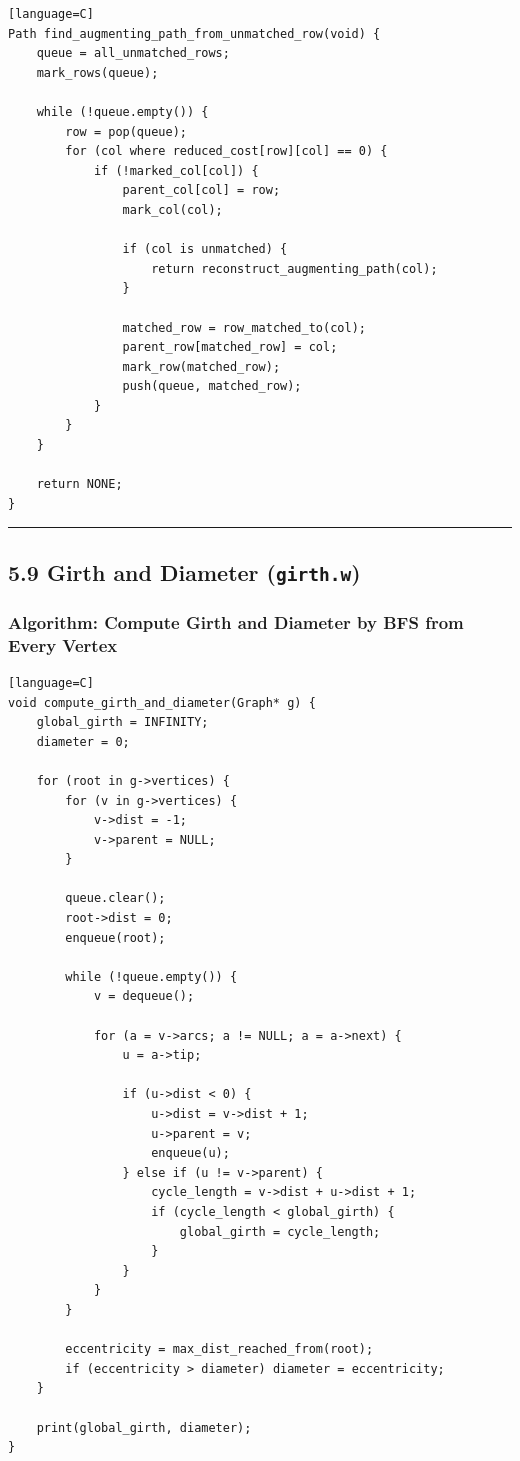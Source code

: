 \documentclass[11pt]{article}
\begin{document}
\begin{verbatim}[language=C]
Path find_augmenting_path_from_unmatched_row(void) {
    queue = all_unmatched_rows;
    mark_rows(queue);

    while (!queue.empty()) {
        row = pop(queue);
        for (col where reduced_cost[row][col] == 0) {
            if (!marked_col[col]) {
                parent_col[col] = row;
                mark_col(col);

                if (col is unmatched) {
                    return reconstruct_augmenting_path(col);
                }

                matched_row = row_matched_to(col);
                parent_row[matched_row] = col;
                mark_row(matched_row);
                push(queue, matched_row);
            }
        }
    }

    return NONE;
}
\end{verbatim}

\begin{center}\rule{0.5\linewidth}{0.5pt}\end{center}

\subsection{\texorpdfstring{5.9 Girth and Diameter (\texttt{girth.w})}{5.9 Girth and Diameter (girth.w)}}\label{girth-and-diameter-girth.w}

\subsubsection{Algorithm: Compute Girth and Diameter by BFS from Every Vertex}\label{algorithm-compute-girth-and-diameter-by-bfs-from-every-vertex}

\begin{verbatim}[language=C]
void compute_girth_and_diameter(Graph* g) {
    global_girth = INFINITY;
    diameter = 0;

    for (root in g->vertices) {
        for (v in g->vertices) {
            v->dist = -1;
            v->parent = NULL;
        }

        queue.clear();
        root->dist = 0;
        enqueue(root);

        while (!queue.empty()) {
            v = dequeue();

            for (a = v->arcs; a != NULL; a = a->next) {
                u = a->tip;

                if (u->dist < 0) {
                    u->dist = v->dist + 1;
                    u->parent = v;
                    enqueue(u);
                } else if (u != v->parent) {
                    cycle_length = v->dist + u->dist + 1;
                    if (cycle_length < global_girth) {
                        global_girth = cycle_length;
                    }
                }
            }
        }

        eccentricity = max_dist_reached_from(root);
        if (eccentricity > diameter) diameter = eccentricity;
    }

    print(global_girth, diameter);
}
\end{verbatim}
\end{document}
